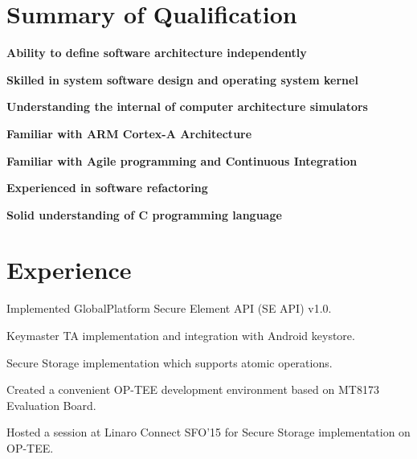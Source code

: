 \documentclass[a4paper]{deedy-resume} %
\begin{document}
%
\begin{minipage}[t]{0.66\textwidth} %

\section{Summary of Qualification} 
\vspace{\topsep} %
\begin{tightitemize}
\item \bf Ability to define software architecture independently
\item \bf Skilled in system software design and operating system kernel
\item \bf Understanding the internal of computer architecture simulators
\item \bf Familiar with ARM Cortex-A Architecture
\item \bf Familiar with Agile programming and Continuous Integration
\item \bf Experienced in software refactoring
\item \bf Solid understanding of C programming language
\end{tightitemize}

\section{Experience}


\vspace{\topsep} %
\begin{tightitemize}
\item Implemented GlobalPlatform Secure Element API (SE API) v1.0.
\item Keymaster TA implementation and integration with Android keystore.
\item Secure Storage implementation which supports atomic operations.
\item Created a convenient OP-TEE development environment based on MT8173 Evaluation Board.
\item Hosted a session at Linaro Connect SFO'15 for Secure Storage implementation on OP-TEE.
\end{tightitemize}


\end{minipage}
\end{document}
